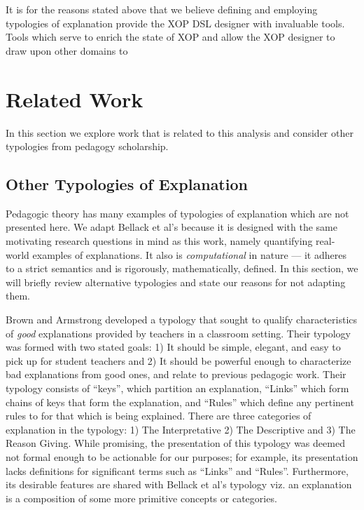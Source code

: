 \documentclass[conference]{IEEEtran}
\begin{document}
It is for the reasons stated above that we believe defining and employing 
typologies of explanation provide the XOP DSL designer with invaluable tools.
Tools which serve to enrich the state of XOP and allow the XOP designer to draw
upon other domains to 

\section{Related Work} \label{rw}
In this section we explore work that is related to this analysis and consider other
typologies from pedagogy scholarship.

\subsection{Other Typologies of Explanation}
Pedagogic theory has many examples of typologies of explanation which are not
presented here. We adapt Bellack et al's because it is designed with the same
motivating research questions in mind as this work, namely quantifying
real-world examples of explanations. It also is \emph{computational} in nature
--- it adheres to a strict semantics and is rigorously, mathematically, defined.
In this section, we will briefly review alternative typologies and state our
reasons for not adapting them.

Brown and Armstrong\cite{brown1984explaining} developed a typology that sought
to qualify characteristics of \emph{good} explanations provided by teachers in a
classroom setting. Their typology was formed with two stated goals: 1) It should
be simple, elegant, and easy to pick up for student teachers and 2) It should be
powerful enough to characterize bad explanations from good ones, and relate to
previous pedagogic work. Their typology consists of ``keys'', which partition an
explanation, ``Links'' which form chains of keys that form the
explanation, and ``Rules'' which define any pertinent rules to for that which is
being explained. There are three categories of explanation in the typology: 1) The
Interpretative 2) The Descriptive and 3) The Reason Giving. While promising,
the presentation of this typology was deemed not formal enough to be actionable
for our purposes; for example, its presentation lacks definitions for significant terms
such as ``Links'' and ``Rules''. Furthermore, its desirable features are shared
with Bellack et al's typology viz. an explanation is a composition of some more
primitive concepts or categories.
\end{document}
